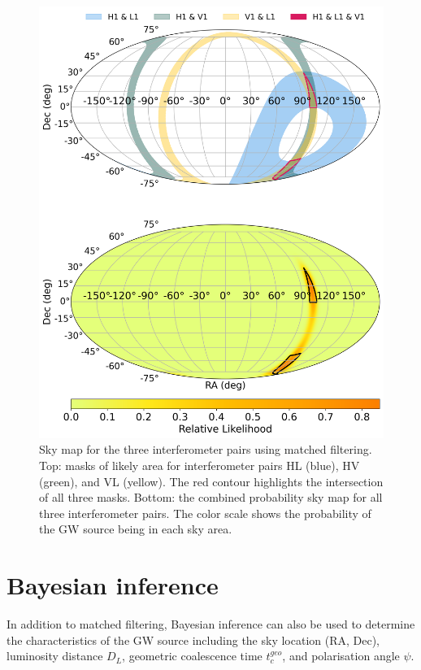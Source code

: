 \documentclass[11pt,a4paper]{article}
\begin{document}
\begin{figure}
    \includegraphics[width=\columnwidth, keepaspectratio]{../figures/detector_skymap_intersection.png}
    \caption{Sky map for the three interferometer pairs using matched filtering. Top: masks of likely area for interferometer pairs HL (blue), HV (green), and VL (yellow). The red contour highlights the intersection of all three masks. Bottom: the combined probability sky map for all three interferometer pairs. The color scale shows the probability of the GW source being in each sky area.}
    \label{fig:skymap_hlv_mf}
\end{figure}

\clearpage
\section{Bayesian inference}
\label{sec:bayesian}
In addition to matched filtering, Bayesian inference can also be used to determine the characteristics of the GW source including the sky location (RA, Dec), luminosity distance $D_L$, geometric coalescence time $t_c^{geo}$, and polarisation angle $\psi$.
\end{document}
